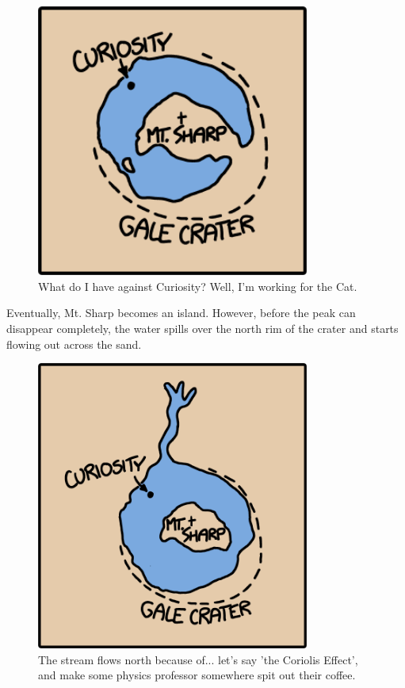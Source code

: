 {\begin{figure}[!htbp]
\centering
\includegraphics[scale=0.5, max width=0.8\textwidth]{imgs/a/54/mars_2.png}
\caption{What do I have against Curiosity? Well, I'm working for the Cat.}
\end{figure}

{Eventually, Mt. Sharp becomes an island. However, before the peak can disappear completely, the water spills over the north rim of the crater and starts flowing out across the sand.}

\begin{figure}[!htbp]
\centering
\includegraphics[scale=0.5, max width=0.8\textwidth]{imgs/a/54/mars_3.png}
\caption{The stream flows north because of... let's say 'the Coriolis Effect', and make some physics professor somewhere spit out their coffee.}
\end{figure}

}
